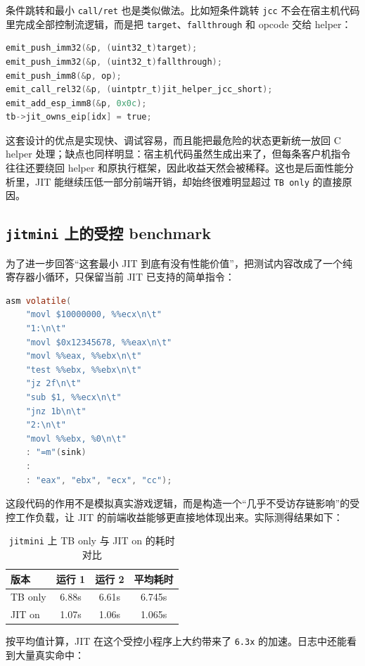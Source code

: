 \documentclass[a4paper]{article}
\begin{document}
条件跳转和最小 \texttt{call/ret} 也是类似做法。比如短条件跳转 \texttt{jcc} 不会在宿主机代码里完成全部控制流逻辑，而是把 \texttt{target}、\texttt{fallthrough} 和 opcode 交给 helper：

\begin{lstlisting}[language=C]
emit_push_imm32(&p, (uint32_t)target);
emit_push_imm32(&p, (uint32_t)fallthrough);
emit_push_imm8(&p, op);
emit_call_rel32(&p, (uintptr_t)jit_helper_jcc_short);
emit_add_esp_imm8(&p, 0x0c);
tb->jit_owns_eip[idx] = true;
\end{lstlisting}

这套设计的优点是实现快、调试容易，而且能把最危险的状态更新统一放回 C helper 处理；缺点也同样明显：宿主机代码虽然生成出来了，但每条客户机指令往往还要绕回 helper 和原执行框架，因此收益天然会被稀释。这也是后面性能分析里，JIT 能继续压低一部分前端开销，却始终很难明显超过 \texttt{TB only} 的直接原因。

\subsection{\texttt{jitmini} 上的受控 benchmark}
为了进一步回答“这套最小 JIT 到底有没有性能价值”，把测试内容改成了一个纯寄存器小循环，只保留当前 JIT 已支持的简单指令：

\begin{lstlisting}[language=C]
asm volatile(
    "movl $10000000, %%ecx\n\t"
    "1:\n\t"
    "movl $0x12345678, %%eax\n\t"
    "movl %%eax, %%ebx\n\t"
    "test %%ebx, %%ebx\n\t"
    "jz 2f\n\t"
    "sub $1, %%ecx\n\t"
    "jnz 1b\n\t"
    "2:\n\t"
    "movl %%ebx, %0\n\t"
    : "=m"(sink)
    :
    : "eax", "ebx", "ecx", "cc");
\end{lstlisting}

这段代码的作用不是模拟真实游戏逻辑，而是构造一个“几乎不受访存链影响”的受控工作负载，让 JIT 的前端收益能够更直接地体现出来。实际测得结果如下：

\begin{table}[H]
  \centering
  \begin{tabular}{lccc}
    \toprule
    版本 & 运行 1 & 运行 2 & 平均耗时 \\
    \midrule
    TB only & 6.88s & 6.61s & 6.745s \\
    JIT on & 1.07s & 1.06s & 1.065s \\
    \bottomrule
  \end{tabular}
  \caption{\texttt{jitmini} 上 TB only 与 JIT on 的耗时对比}
\end{table}

按平均值计算，JIT 在这个受控小程序上大约带来了 \texttt{6.3x} 的加速。日志中还能看到大量真实命中：
\end{document}
